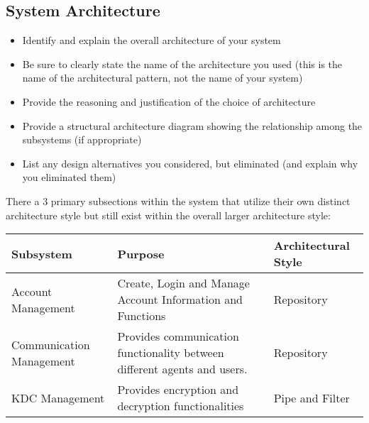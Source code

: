\documentclass[]{article}
\begin{document}
\subsection{System Architecture}
\label{sub:system_architecture}
\begin{itemize}
	\item Identify and explain the overall architecture of your system
	\item Be sure to clearly state the name of the architecture you used (this is the name of the architectural pattern, not the name of your system)
	\item Provide the reasoning and justification of the choice of architecture
	\item Provide a structural architecture diagram showing the relationship among the subsystems (if appropriate)
	\item List any design alternatives you considered, but eliminated (and explain why you eliminated them)
\end{itemize}

There a 3 primary subsections within the system that utilize their own distinct architecture style but still exist within the overall larger architecture style:
\begin{center}
	\begin{tabular}{|p{2in} | p{2in}| p{2in}|}
		\hline
		Subsystem                & Purpose                                                                  & Architectural Style \\
		\hline
		Account Management       & Create, Login and Manage Account Information and Functions               & Repository          \\
		\hline
		Communication Management & Provides communication functionality between different agents and users. & Repository          \\
		\hline
		KDC Management           & Provides encryption and decryption functionalities                       & Pipe and Filter     \\
		\hline
	\end{tabular}
\end{center}
\end{document}

